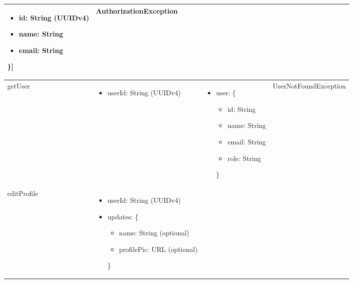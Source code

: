 \documentclass[12pt, titlepage]{article}
\begin{document}
\begin{center}
\begin{tabular}{p{2cm} p{4cm} p{2cm} p{4cm}}
\begin{minipage}{3.5cm}
\begin{itemize}[leftmargin=*,noitemsep]
\begin{itemize}[leftmargin=*,noitemsep]
        \item id: String (UUIDv4)
        \item name: String
        \item email: String
      \end{itemize}\}]
  \end{itemize}
  \end{minipage} & 
  AuthorizationException \\
  \hline
  getUser & 
  \begin{minipage}{3.5cm}
  \vspace{-0.2cm}
  \begin{itemize}[leftmargin=*,noitemsep]
    \item userId: String (UUIDv4)
  \end{itemize}
  \end{minipage} & 
  \begin{minipage}{3.5cm}
  \vspace{-0.2cm}
  \begin{itemize}[leftmargin=*,noitemsep]
    \item user: \{
      \begin{itemize}[leftmargin=*,noitemsep]
        \item id: String
        \item name: String
        \item email: String
        \item role: String
      \end{itemize}\}
  \end{itemize}
  \end{minipage} & 
  UserNotFoundException \\
  \hline
  editProfile & 
  \begin{minipage}{3.5cm}
  \vspace{-0.2cm}
  \begin{itemize}[leftmargin=*,noitemsep]
    \item userId: String (UUIDv4)
    \item updates: \{
      \begin{itemize}[leftmargin=*,noitemsep]
        \item name: String (optional)
        \item profilePic: URL (optional)
      \end{itemize}\}
  \end{itemize}
  \end{minipage} & 
  \begin{minipage}{3.5cm}
  \vspace{-0.2cm}

\end{minipage}
\end{tabular}
\end{center}
\end{document}
